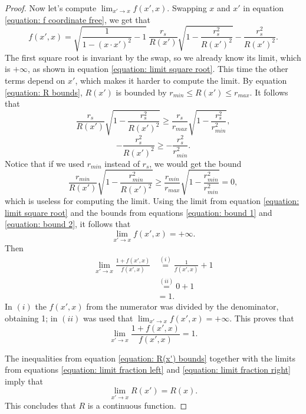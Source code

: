 \documentclass[10pt,a4paper]{amsart}
\begin{document}
\begin{proof}
	Now let's compute $\lim_{x' \to x} f(x', x)$. Swapping $x$ and $x'$ in equation \ref{equation: f coordinate free}, we get that
	\begin{equation}
		f(x', x) = \sqrt{ \frac{1}{1 - (x \cdot x' )^2} -1} \ \frac{r_s}{R(x')} \sqrt{1 - \frac{r_s^2}{R(x')^2}} -\frac{r_s^2}{R(x')^2}.
	\end{equation}
	The first square root is invariant by the swap, so we already know its limit, which is $+\infty$, as shown in equation \ref{equation: limit square root}. This time the other terms depend on $x'$, which makes it harder to compute the limit. By equation \ref{equation: R bounds}, $R(x')$ is bounded by $r_{min} \leq R(x') \leq r_{max}$. It follows that
	\begin{equation}
		\label{equation: bound 1}
		\frac{r_s}{R(x')} \sqrt{1 - \frac{r_s^2}{R(x')^2}} \geq \frac{r_s}{r_{max}} \sqrt{1 - \frac{r_s^2}{r_{min}^2}},
	\end{equation}
	\begin{equation}
		\label{equation: bound 2}
		-\frac{r_s^2}{R(x')^2} \geq -\frac{r_s^2}{r_{min}^2}.
	\end{equation}
	Notice that if we used $r_{min}$ instead of $r_s$, we would get the bound
	\begin{equation}
		\frac{r_{min}}{R(x')} \sqrt{1 - \frac{r_{min}^2}{R(x')^2}} \geq \frac{r_{min}}{r_{max}} \sqrt{1 - \frac{r_{min}^2}{r_{min}^2}} = 0,
	\end{equation}
	which is useless for computing the limit. Using the limit from equation \ref{equation: limit square root} and the bounds from equations \ref{equation: bound 1} and \ref{equation: bound 2}, it follows that
	\begin{equation}
		\lim_{x' \to x} f(x', x) = +\infty.
	\end{equation}
	Then
	\begin{align*}
		\lim_{x' \to x} \frac{1+f(x',x)}{f(x',x)} &\stackrel{(i)}{=} \frac{1}{f(x', x)} +1\\
		&\stackrel{(ii)}{=} 0+1 \\
		&= 1.
	\end{align*}
	In $(i)$ the $f(x', x)$ from the numerator was divided by the denominator, obtaining 1; in $(ii)$ was used that $\lim_{x' \to x} f(x', x) = +\infty$. This proves that
	\begin{equation}
		\label{equation: limit fraction right}
		\lim_{x' \to x} \frac{1+f(x',x)}{f(x',x)} = 1.
	\end{equation}
	
	The inequalities from equation \ref{equation: R(x') bounds} together with the limits from equations \ref{equation: limit fraction left} and \ref{equation: limit fraction right} imply that
	\begin{equation}
		\lim_{x' \to x} R(x') = R(x).
	\end{equation}
	This concludes that $R$ is a continuous function.
	

\end{proof}
\end{document}
